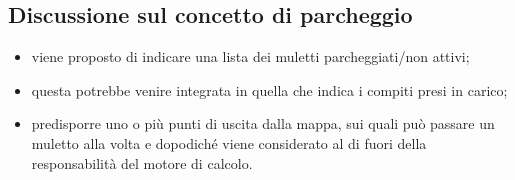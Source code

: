 \subsection{Discussione sul concetto di parcheggio}
\label{park}
    \begin{itemize}
        \item viene proposto di indicare una lista dei muletti parcheggiati/non attivi;
        \item questa potrebbe venire integrata in quella che indica i compiti presi in carico;
        \item predisporre uno o più punti di uscita dalla mappa, sui quali può passare un muletto alla volta e dopodiché viene considerato al di fuori della responsabilità del motore di calcolo.
    \end{itemize}











